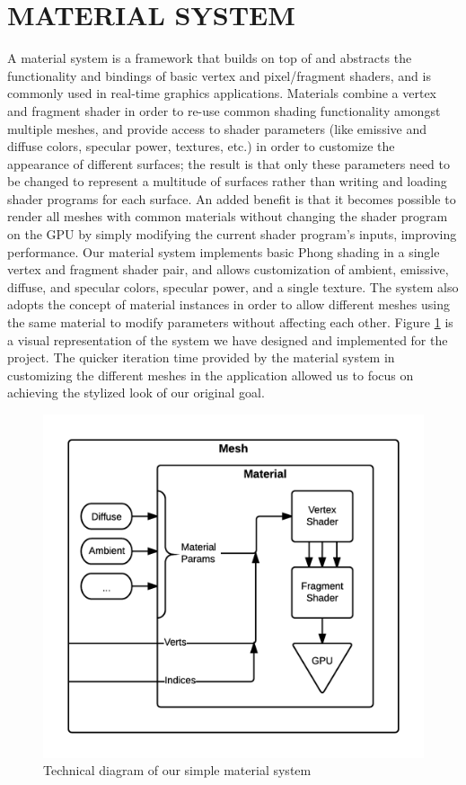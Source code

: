 \documentclass[a4paper,twoside]{article}
\begin{document}
\section{\uppercase{Material System}}
\label{sec:mat_sys}
\noindent A material system is a framework that builds on top of and abstracts the functionality and bindings of basic vertex and pixel/fragment shaders, and is commonly used in real-time graphics applications. Materials combine a vertex and fragment shader in order to re-use common shading functionality amongst multiple meshes, and provide access to shader parameters (like emissive and diffuse colors, specular power, textures, etc.) in order to customize the appearance of different surfaces; the result is that only these parameters need to be changed to represent a multitude of surfaces rather than writing and loading shader programs for each surface. An added benefit is that it becomes possible to render all meshes with common materials without changing the shader program on the GPU by simply modifying the current shader program's inputs, improving performance. Our material system implements basic Phong shading in a single vertex and fragment shader pair, and allows customization of ambient, emissive, diffuse, and specular colors, specular power, and a single texture. The system also adopts the concept of material instances in order to allow different meshes using the same material to modify parameters without affecting each other. Figure \ref{fig_ms} is a visual representation of the system we have designed and implemented for the project. The quicker iteration time provided by the material system in customizing the different meshes in the application allowed us to focus on achieving the stylized look of our original goal.

\begin{figure}
\includegraphics[scale=0.75]{./images/materials/ms_overview.png}
\caption{Technical diagram of our simple material system}
\label{fig_ms}
\end{figure}
\end{document}
